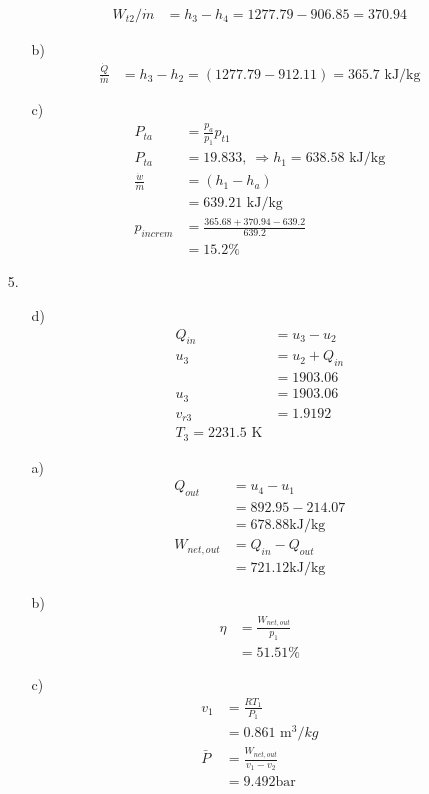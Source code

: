 \documentclass{article}
\begin{document}
\begin{itemize}
\begin{itemize}
\begin{align*}
            W_{t2}/\dot m&=h_3-h_4=1277.79-906.85=370.94
        \end{align*}
        \item [b)]
        \begin{align*}
            \frac{\dot Q}{\dot m}&=h_3-h_2=(1277.79-912.11)=365.7\text{ kJ/kg}
        \end{align*}
        \item [c)]
        \begin{align*}
            P_{ta}&=\frac{p_a}{p_1}p_{t1}\\
            P_{ta}&=19.833,\ \Rightarrow h_1 = 638.58 \text{ kJ/kg}\\
            \frac{\dot w}{\dot m}&=(h_1-h_a)\\
            &=639.21 \text{ kJ/kg}\\
            p_{increm}&=\frac{365.68+370.94-639.2}{639.2}\\
            &=15.2\%
        \end{align*}
    \end{itemize}
    \item [5.]
    \begin{itemize}
        \item [d)]
        \begin{align*}
            Q_{in}&=u_3-u_2\\
            u_3&=u_2+Q_{in}\\
            &=1903.06\\
            u_3&=1903.06\\
            v_{r3}&=1.9192\\
            T_3=2231.5 \text{ K}
        \end{align*}
        \item [a)]
        \begin{align*}
            Q_{out}&=u_4-u_1\\
            &=892.95-214.07\\
            &=678.88\text{kJ/kg}\\
            W_{net,out}&=Q_{in}-Q_{out}\\
            &=721.12 \text{kJ/kg}
        \end{align*}
        \item [b)]
        \begin{align*}
            \eta&=\frac{W_{net,out}}{p_1}\\
            &=51.51\%
        \end{align*}
        \item [c)]
        \begin{align*}
            v_1&=\frac{RT_1}{P_1}\\
            &=0.861 \text{ m}^3/kg\\
            \bar P&=\frac{W_{net,out}}{v_1-v_2}\\
            &=9.492 \text{bar}
        \end{align*}
    \end{itemize}
\end{itemize}     
\end{document}
